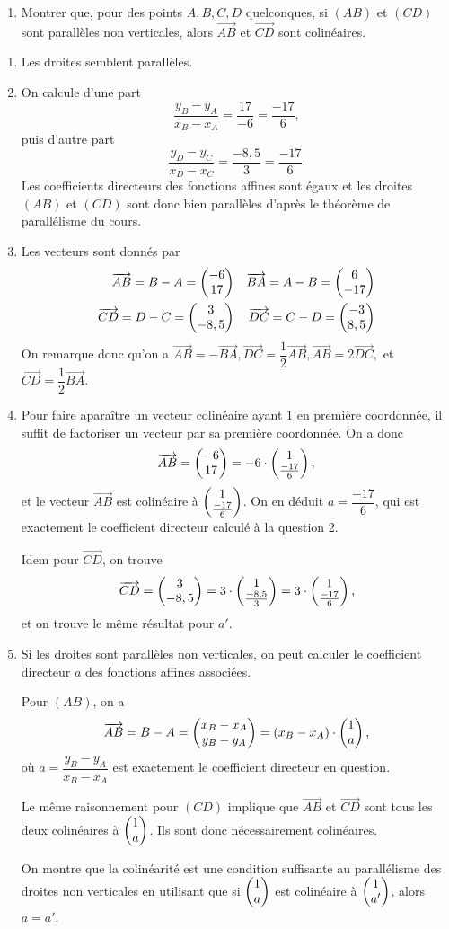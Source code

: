 {\begin{enumerate}
		\item Montrer que, pour des points $A, B, C, D$ quelconques, si $(AB)$ et $(CD)$ sont parallèles non verticales, alors $\vec{AB}$ et $\vec{CD}$ sont colinéaires.
	\end{enumerate}

}{
	\begin{enumerate}
		\item Les droites semblent parallèles.
		
		\item On calcule d'une part
			\[ \dfrac{y_B - y_A}{x_B - x_A} = \dfrac{17}{-6} = \dfrac{-17}{6}, \]
		puis d'autre part
			\[ \dfrac{y_D - y_C}{x_D - x_C} = \dfrac{-8,5}{3} = \dfrac{-17}{6}. \]
		Les coefficients directeurs des fonctions affines sont égaux et les droites $(AB)$ et $(CD)$ sont donc bien parallèles d'après le théorème de parallélisme du cours.

		\item 
		Les vecteurs sont donnés par
			\begin{align*}
				\overrightarrow{AB} = B-A = \begin{pmatrix} -6 \\ 17 \end{pmatrix} && \overrightarrow{BA} = A - B = \begin{pmatrix} 6 \\ -17 \end{pmatrix} \\
				\overrightarrow{CD} = D - C = \begin{pmatrix} 3 \\ -8,5 \end{pmatrix} && \overrightarrow{DC} = C - D = \begin{pmatrix} -3 \\ 8,5 \end{pmatrix}
			\end{align*}
		On remarque donc qu'on a $\vec{AB} = - \vec{BA}, \vec{DC} = \dfrac12 \vec{AB}, \vec{AB} = 2 \vec{DC},$ et $\vec{CD} = \dfrac12 \vec{BA}$.
		
		\item Pour faire aparaître un vecteur colinéaire ayant $1$ en première coordonnée, il suffit de factoriser un vecteur par sa première coordonnée.
		On a donc
			\[ \overrightarrow{AB} = \begin{pmatrix} -6 \\ 17 \end{pmatrix} = -6 \cdot \begin{pmatrix} 1 \\ \frac{-17}{6} \end{pmatrix}, \]
		et le vecteur $\vec{AB}$ est colinéaire à $\begin{pmatrix} 1 \\ \frac{-17}{6} \end{pmatrix}$.
		On en déduit $a = \dfrac{-17}{6}$, qui est exactement le coefficient directeur calculé à la question 2.
		
		Idem pour $\vec{CD}$, on trouve
			\[ \overrightarrow{CD} = \begin{pmatrix} 3 \\ -8,5 \end{pmatrix} = 3 \cdot \begin{pmatrix} 1 \\ \frac{-8,5}{3} \end{pmatrix} = 3 \cdot \begin{pmatrix} 1 \\ \frac{-17}{6} \end{pmatrix}, \]
		et on trouve le même résultat pour $a'$.
		
		\item
		Si les droites sont parallèles non verticales, on peut calculer le coefficient directeur $a$ des fonctions affines associées.
		
		Pour $(AB)$, on a
			\[ \overrightarrow{AB} = B - A = \begin{pmatrix} x_B - x_A \\ y_B - y_A \end{pmatrix} = (x_B - x_A) \cdot \begin{pmatrix} 1 \\ a \end{pmatrix}, \]
		où $a = \dfrac{y_B - y_A}{x_B-x_A}$ est exactement le coefficient directeur en question.
		
		Le même raisonnement pour $(CD)$ implique que $\vec{AB}$ et $\vec{CD}$ sont tous les deux colinéaires à $\begin{pmatrix} 1 \\ a \end{pmatrix}$. Ils sont donc nécessairement colinéaires.
		
		On montre que la colinéarité est une condition suffisante au parallélisme des droites non verticales en utilisant que si $\begin{pmatrix} 1 \\ a \end{pmatrix}$ est colinéaire à $\begin{pmatrix} 1 \\ a' \end{pmatrix}$, alors $a=a'$.
	\end{enumerate}
}

